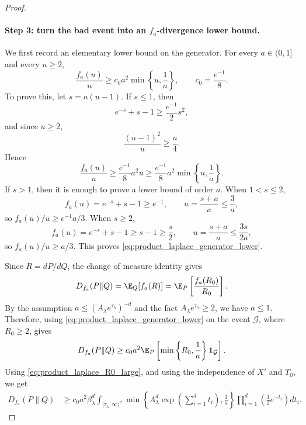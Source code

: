 \begin{proof}
    \paragraph{Step 3: turn the bad event into an $f_a$-divergence lower bound.}
    We first record an elementary lower bound on the generator.  For every
    $a\in(0,1]$ and every $u\ge2$,
    \[
        \frac{f_a(u)}{u}
        \ge
        c_0 a^2\min\left\{u,\frac1a\right\},
        \qquad
        c_0=\frac{e^{-1}}{8}.
        \label{eq:product_laplace_generator_lower}
    \]
    To prove this, let $s=a(u-1)$. If $s\le1$, then
    \[
        e^{-s}+s-1\ge \frac{e^{-1}}{2}s^2,
    \]
    and since $u\ge2$,
    \[
        \frac{(u-1)^2}{u}\ge \frac{u}{4}.
    \]
    Hence
    \[
        \frac{f_a(u)}{u}
        \ge
        \frac{e^{-1}}{8}a^2u
        \ge
        \frac{e^{-1}}{8}a^2\min\left\{u,\frac1a\right\}.
    \]
    If $s>1$, then it is enough to prove a lower bound of order $a$.
    When $1<s\le2$,
    \[
        f_a(u)=e^{-s}+s-1\ge e^{-1},
        \qquad
        u=\frac{s+a}{a}\le \frac{3}{a},
    \]
    so $f_a(u)/u\ge e^{-1}a/3$. When $s\ge2$,
    \[
        f_a(u)=e^{-s}+s-1\ge s-1\ge \frac{s}{2},
        \qquad
        u=\frac{s+a}{a}\le \frac{3s}{2a},
    \]
    so $f_a(u)/u\ge a/3$. This proves
    \eqref{eq:product_laplace_generator_lower}.

    Since $R=dP/dQ$, the change of measure identity gives
    \[
        D_{f_a}(P\|Q)
        =
        \E_Q[f_a(R)]
        =
        \E_P\left[\frac{f_a(R_0)}{R_0}\right].
    \]
    By the assumption $a\le(A_\lambda e^{\tau_\lambda})^{-d}$ and the fact
    $A_\lambda e^{\tau_\lambda}\ge2$, we have $a\le1$. Therefore, using
    \eqref{eq:product_laplace_generator_lower} on the event $\mathcal G$,
    where $R_0\ge2$, gives
    \[
        D_{f_a}(P\|Q)
        \ge
        c_0a^2
        \E_P\left[
            \min\left\{R_0,\frac1a\right\}
            \mathbf{1}_{\mathcal G}
            \right].
    \]
    Using \eqref{eq:product_laplace_R0_large}, and using the independence of
    $X'$ and $T_0$, we get
    \[
        \begin{aligned}
            D_{f_a}(P\|Q)
             & \ge
            c_0a^2\beta_\lambda^d
            \int_{[\tau_\lambda,\infty)^d}
            \min\left\{
            A_\lambda^d
            \exp\left(\sum_{i=1}^d t_i\right),
            \frac1a
            \right\}
            \prod_{i=1}^d
            \left(\frac12 e^{-t_i}\right)
            dt_i .
        \end{aligned}
        \label{eq:product_laplace_integral_lower}
    \]


\end{proof}
